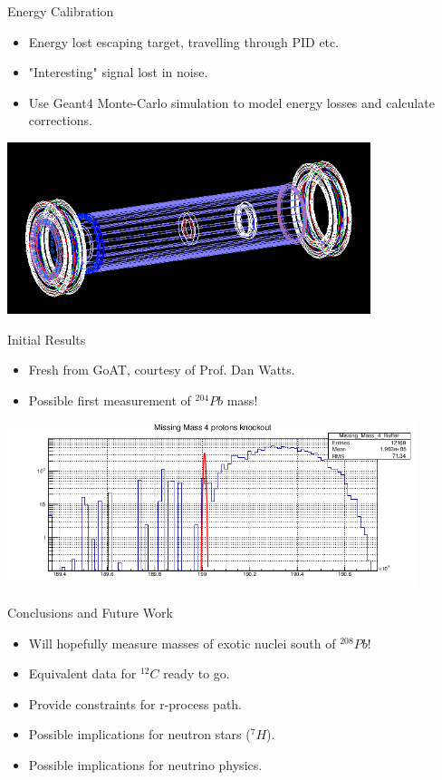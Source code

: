 \documentclass{beamer}
\begin{document}

\begin{frame}{Energy Calibration}

\begin{itemize}
    \item Energy lost escaping target, travelling through PID etc.
    \item "Interesting" signal lost in noise.
    \item Use Geant4 Monte-Carlo simulation to model energy losses and calculate corrections.
\end{itemize}

    \centering
    \includegraphics[height= 5cm]{AllIn}

\end{frame}

\begin{frame}{Initial Results}

\begin{itemize}
    \item Fresh from GoAT, courtesy of Prof. Dan Watts.
    \item Possible first measurement of $^{204}Pb$ mass!
\end{itemize}
\centering
\includegraphics[width=12cm]{DanResult}
    
\end{frame}

\begin{frame}{Conclusions and Future Work}
\begin{itemize}
    \item Will hopefully measure masses of exotic nuclei south of $^{208}Pb$!
    \item Equivalent data for $^{12}C$ ready to go.
    \item Provide constraints for r-process path.
    \item Possible implications for neutron stars ($^{7}H$).
    \item Possible implications for neutrino physics.
\end{itemize}
\end{frame}
\end{document}

